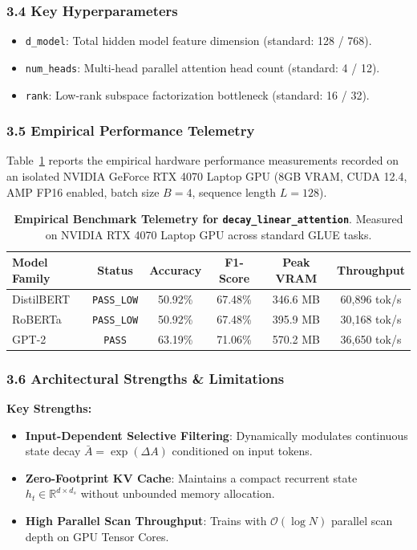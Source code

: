 \subsubsection*{3.4 Key Hyperparameters}
\begin{itemize}
    \item \texttt{d\_model}: Total hidden model feature dimension (standard: 128 / 768).
    \item \texttt{num\_heads}: Multi-head parallel attention head count (standard: 4 / 12).
    \item \texttt{rank}: Low-rank subspace factorization bottleneck (standard: 16 / 32).
\end{itemize}

\subsubsection*{3.5 Empirical Performance Telemetry}
Table~\ref{tab:telemetry_decay_linear_attention} reports the empirical hardware performance measurements recorded on an isolated NVIDIA GeForce RTX 4070 Laptop GPU (8GB VRAM, CUDA 12.4, AMP FP16 enabled, batch size $B=4$, sequence length $L=128$).

\begin{table}[h]
\centering
\small
\caption{\textbf{Empirical Benchmark Telemetry for \texttt{decay\_linear\_attention}}. Measured on NVIDIA RTX 4070 Laptop GPU across standard GLUE tasks.}
\label{tab:telemetry_decay_linear_attention}
\begin{tabular*}{\columnwidth}{@{\extracolsep{\fill}}lccccc}
\toprule
\textbf{Model Family} & \textbf{Status} & \textbf{Accuracy} & \textbf{F1-Score} & \textbf{Peak VRAM} & \textbf{Throughput} \\
\midrule
DistilBERT & \texttt{PASS\_LOW} & 50.92\% & 67.48\% & 346.6 MB & 60,896 tok/s \\
RoBERTa & \texttt{PASS\_LOW} & 50.92\% & 67.48\% & 395.9 MB & 30,168 tok/s \\
GPT-2 & \texttt{PASS} & 63.19\% & 71.06\% & 570.2 MB & 36,650 tok/s \\
\bottomrule
\end{tabular*}
\end{table}

\subsubsection*{3.6 Architectural Strengths \& Limitations}
\textbf{Key Strengths:}
\begin{itemize}
    \item \textbf{Input-Dependent Selective Filtering}: Dynamically modulates continuous state decay $\bar{A} = \exp(\Delta A)$ conditioned on input tokens.
    \item \textbf{Zero-Footprint KV Cache}: Maintains a compact recurrent state $h_t \in \mathbb{R}^{d \times d_s}$ without unbounded memory allocation.
    \item \textbf{High Parallel Scan Throughput}: Trains with $\mathcal{O}(\log N)$ parallel scan depth on GPU Tensor Cores.
\end{itemize}

